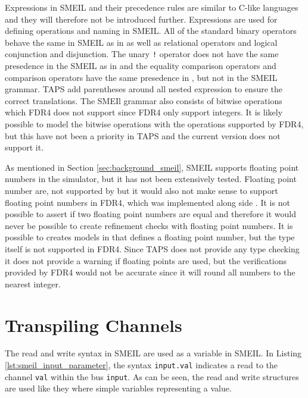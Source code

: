 Expressions in SMEIL and their precedence rules are similar to C-like languages and they will therefore not be introduced further. Expressions are used for defining operations and naming in SMEIL. All of the standard binary operators behave the same in SMEIL as in \cspm{} as well as relational operators and logical conjunction and disjunction. The unary \texttt{!} operator does not have the same presedence in the SMEIL as in \cspm{} and the equality comparison operators and comparison operators have the same presedence in \cspm{}, but not in the SMEIL grammar. TAPS add parentheses around all nested expression to ensure the correct translations. The SMEIl grammar also consists of bitwise operations which FDR4 does not support since FDR4 only support integers. It is likely possible to model the bitwise operations with the operations supported by FDR4, but this have not been a priority in TAPS and the current version does not support it.

As mentioned in Section \ref{sec:background_smeil}, SMEIL supports floating point numbers in the simulator, but it has not been extensively tested. Floating point number are, not supported by \cspm{}\cite{Scattergood2011} but it would also not make sense to support floating point numbers in FDR4, which was implemented along side \cspm{}. It is not possible to assert if two floating point numbers are equal and therefore it would never be possible to create refinement checks with floating point numbers. It is possible to creates models in \cspm{} that defines a floating point number, but the type itself is not supported in FDR4. Since TAPS does not provide any type checking it does not provide a warning if floating points are used, but the verifications provided by FDR4 would not be accurate since it will round all numbers to the nearest integer.


\section{Transpiling Channels}
 The read and write syntax in SMEIL are used as a variable in SMEIL. In Listing \ref{lst:smeil_input_parameter}, the syntax \texttt{input.val} indicates a read to the channel \texttt{val} within the bus \texttt{input}. As can be seen, the read and write structures are used like they where simple variables representing a value.

